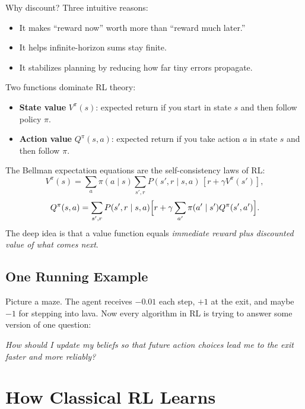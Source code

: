\documentclass[11pt]{article}
\begin{document}
  Why discount? Three intuitive reasons:

  \begin{itemize}
    \item It makes ``reward now'' worth more than ``reward much later.''
    \item It helps infinite-horizon sums stay finite.
    \item It stabilizes planning by reducing how far tiny errors propagate.
  \end{itemize}

  Two functions dominate RL theory:

  \begin{itemize}
    \item \textbf{State value} $V^\pi(s)$: expected return if you start in state $s$ and then follow policy $\pi$.
    \item \textbf{Action value} $Q^\pi(s,a)$: expected return if you take action $a$ in state $s$ and then follow $\pi$.
  \end{itemize}

  \begin{mathbox}
  The Bellman expectation equations are the self-consistency laws of RL:
  \[
  V^\pi(s)=\sum_a \pi(a\mid s) \sum_{s',r} P(s',r\mid s,a)\,[r+\gamma V^\pi(s')],
  \]
  \[
  Q^\pi(s,a)=\sum_{s',r} P(s',r\mid s,a)\Bigl[r+\gamma \sum_{a'}\pi(a'\mid s')Q^\pi(s',a')\Bigr].
  \]
  The deep idea is that a value function equals \emph{immediate reward plus discounted value of what comes next}.
  \end{mathbox}

  \subsection{One Running Example}

  Picture a maze. The agent receives $-0.01$ each step, $+1$ at the exit, and maybe $-1$ for stepping into lava. Now every algorithm in RL is trying to answer some version of one question:

  \begin{center}
  \emph{How should I update my beliefs so that future action choices lead me to the exit faster and more reliably?}
  \end{center}

  \section{How Classical RL Learns}
\end{document}
